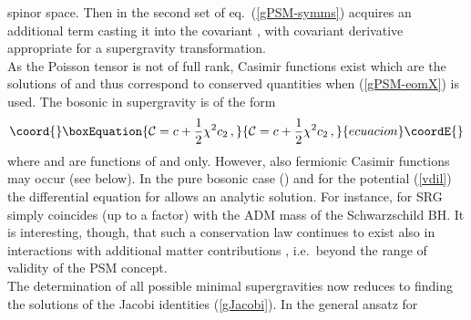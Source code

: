 \documentclass[a4paper,10pt]{article}
\providecommand{\half}{\frac{1}{2}}
\providecommand{\casimir}{c}
\renewcommand{\^}{{}^}
\renewcommand{\_}{\!{}_}
\begin{document}
spinor space. Then \coordHE{} in the second set of 
eq.\ (\ref{gPSM-symms}) acquires an additional term casting it into the 
covariant \coordHE{}, with covariant derivative 
\coordHE{}  appropriate for a supergravity transformation. \\
As the Poisson tensor \coordHE{} is not of full 
rank, Casimir functions \coordHE{} exist 
which are the solutions of \coordHE{} and 
thus correspond to conserved quantities \coordHE{} when (\ref{gPSM-eomX}) is used.   
The bosonic \coordHE{} in  supergravity is of the form 
\begin{equation}\coord{}\boxEquation{
  \label{Casimir}
  \mathcal{C} = \casimir + \half \chi^2 \casimir_2\, ,
}{
  \mathcal{C} = \casimir + \half \chi^2 \casimir_2\, ,
}{ecuacion}\coordE{}\end{equation}
where \myHighlight{$\casimir$}\coordHE{} and \myHighlight{$\casimir_2$}\coordHE{} are functions of \myHighlight{$\phi$}\coordHE{} 
and \coordHE{} only. 
However, also 
fermionic Casimir functions may occur (see below). In the 
pure bosonic case (\coordHE{}) and for the potential 
(\ref{vdil}) the differential equation for \coordHE{} allows an 
analytic solution. For instance, \coordHE{} for SRG simply coincides 
(up to a factor) with the ADM mass of the Schwarzschild BH. 
It is interesting, though, that such a conservation law 
continues to exist also in interactions with additional 
matter contributions \cite{Kummer:1995qv}, i.e.\ beyond the range of 
validity of the PSM concept. \\
The determination of all possible minimal supergravities 
\cite{EKS,Ertl:Diss} now reduces to finding the solutions of the Jacobi 
identities (\ref{gJacobi}). In the general ansatz for 
\coordHE{} 
\end{document}
